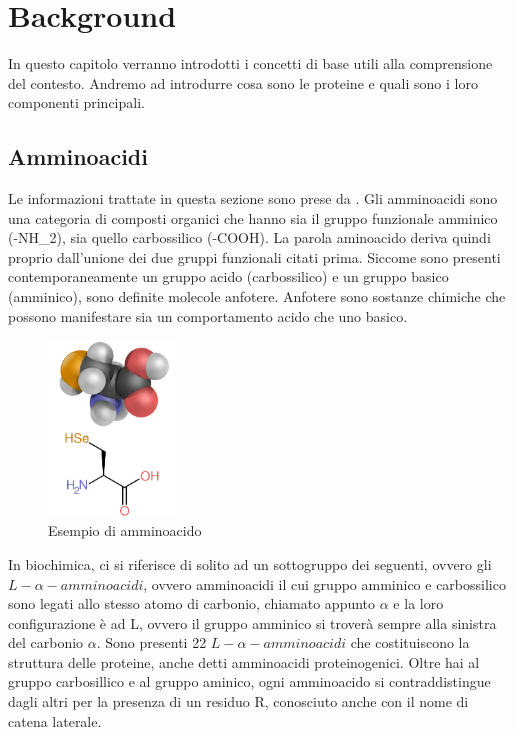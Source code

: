 \chapter{Background}\label{chapter:background}
In questo capitolo verranno introdotti i concetti di base utili alla comprensione del contesto. Andremo ad introdurre cosa sono 
le proteine e quali sono i loro componenti principali.

\section{Amminoacidi}\label{sec:cap_sec_subsec}
Le informazioni trattate in questa sezione sono prese da \cite{WikiAmminoacidi}.
Gli amminoacidi sono una categoria di composti organici che hanno sia il gruppo funzionale amminico (-NH\_2), sia quello carbossilico (-COOH). La parola aminoacido 
deriva quindi proprio dall'unione dei due gruppi funzionali citati prima. Siccome sono presenti contemporaneamente un gruppo acido (carbossilico) e un gruppo basico (amminico), 
sono definite molecole anfotere. Anfotere sono sostanze chimiche che possono manifestare sia un comportamento acido che uno basico. 

\begin{figure}
    \centering
    \includegraphics[width=0.3\textwidth]{Immagini/800px-Selenocysteine_skeletal_3D.png}
    \caption{Esempio di amminoacido}
    \label{fig:Amminoacido}
\end{figure}

In biochimica, ci si riferisce di solito ad un sottogruppo dei seguenti, ovvero gli $L-\alpha-amminoacidi$, ovvero amminoacidi il cui gruppo amminico e carbossilico sono 
legati allo stesso atomo di carbonio, chiamato appunto $\alpha$ e la loro configurazione è ad L, ovvero il gruppo amminico si troverà sempre alla sinistra del carbonio $\alpha$.
Sono presenti 22 $L-\alpha-amminoacidi$ che costituiscono la struttura delle proteine, anche detti amminoacidi proteinogenici. 
Oltre hai al gruppo carbosillico e al gruppo aminico, ogni amminoacido si contraddistingue dagli altri per la presenza di un residuo R, conosciuto anche con il nome di 
catena laterale.


